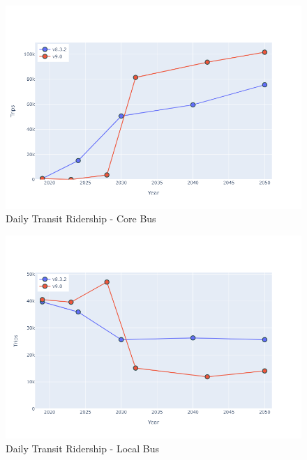 \documentclass[
  letterpaper,
  DIV=11,
  numbers=noendperiod]{scrreprt}
\begin{document}
\begin{figure}[H]

{\centering \includegraphics{v9x/v900/whats-new/_pictures/pdf-hy-tr-cor.png}

}

\caption{\label{fig-hy-tr-cor}Daily Transit Ridership - Core Bus}

\end{figure}

\begin{figure}[H]

{\centering \includegraphics{v9x/v900/whats-new/_pictures/pdf-hy-tr-lcl.png}

}

\caption{\label{fig-pdf-hy-tr-lcl}Daily Transit Ridership - Local Bus}

\end{figure}
\end{document}
